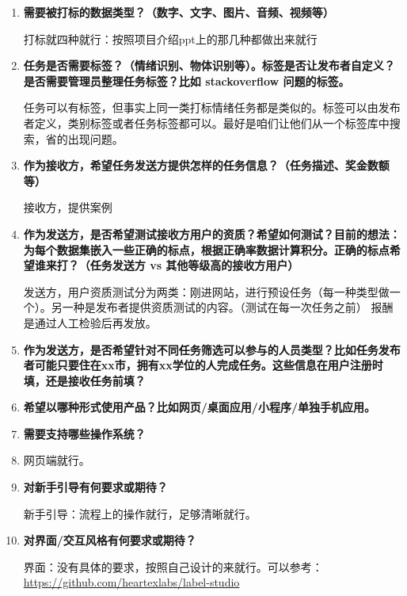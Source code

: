 \begin{enumerate}
    
    \item \textbf{需要被打标的数据类型？（数字、文字、图片、音频、视频等）}

    打标就四种就行：按照项目介绍ppt上的那几种都做出来就行
    
    \item \textbf{任务是否需要标签？（情绪识别、物体识别等）。标签是否让发布者自定义？是否需要管理员整理任务标签？比如 stackoverflow 问题的标签。}
    
    任务可以有标签，但事实上同一类打标情绪任务都是类似的。标签可以由发布者定义，类别标签或者任务标签都可以。最好是咱们让他们从一个标签库中搜索，省的出现问题。

    \item \textbf{作为接收方，希望任务发送方提供怎样的任务信息？（任务描述、奖金数额等）}
    
    接收方，提供案例

    \item \textbf{作为发送方，是否希望测试接收方用户的资质？希望如何测试？目前的想法：为每个数据集嵌入一些正确的标点，根据正确率数据计算积分。正确的标点希望谁来打？（任务发送方 vs 其他等级高的接收方用户）}
    
    发送方，用户资质测试分为两类：刚进网站，进行预设任务（每一种类型做一个）。另一种是发布者提供资质测试的内容。（测试在每一次任务之前）
	报酬是通过人工检验后再发放。

    \item \textbf{作为发送方，是否希望针对不同任务筛选可以参与的人员类型？比如任务发布者可能只要住在xx市，拥有xx学位的人完成任务。这些信息在用户注册时填，还是接收任务前填？}
    \item \textbf{希望以哪种形式使用产品？比如网页/桌面应用/小程序/单独手机应用。}
    \item \textbf{需要支持哪些操作系统？}
    \item 
    网页端就行。

    \item \textbf{对新手引导有何要求或期待？}
    
    新手引导：流程上的操作就行，足够清晰就行。

    \item \textbf{对界面/交互风格有何要求或期待？}

    界面：没有具体的要求，按照自己设计的来就行。可以参考：\url{https://github.com/heartexlabs/label-studio}

\end{enumerate}